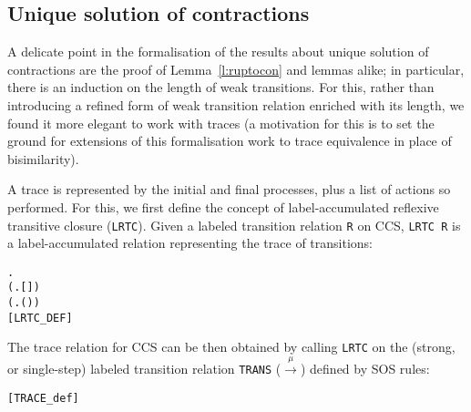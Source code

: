 \subsection{Unique solution of contractions}

A delicate point in the formalisation of the results about unique solution of
contractions are the proof of Lemma~\ref{l:ruptocon} and lemmas alike;
in particular, there is
 an induction on the length of weak transitions. 
For this, rather than 
 introducing a refined form of weak transition relation
enriched with its length, 
we found it more elegant  to  work with traces
(a motivation for this is to set the ground for extensions of this
formalisation work to trace equivalence in place of bisimilarity).



A trace is represented by the initial and final processes, plus
a list of actions  so performed.
For this, we first 
 define the concept of label-accumulated reflexive transitive closure
 (\texttt{LRTC}).
Given a labeled transition relation \texttt{R} on CCS, \texttt{LRTC R} is
a label-accumulated relation representing the trace of transitions:
\begin{alltt}
     \HOLSymConst{\HOLTokenDefEquality{}}
  \HOLSymConst{\HOLTokenForall{}}.
      (\HOLSymConst{\HOLTokenForall{}}.   [] ) \HOLSymConst{\HOLTokenConj{}}
      (\HOLSymConst{\HOLTokenForall{}}    .     \HOLSymConst{\HOLTokenConj{}}     \HOLSymConst{\HOLTokenImp{}}   (\HOLSymConst{::}) ) \HOLSymConst{\HOLTokenImp{}}
         \hfill{[LRTC_DEF]}
\end{alltt}
The trace relation for CCS can be then obtained
 by calling \texttt{LRTC} on the (strong, or single-step) labeled transition
 relation \texttt{TRANS} ($\overset{\mu}{\rightarrow}$) defined by SOS rules:
\begin{alltt}
 \HOLSymConst{\HOLTokenDefEquality{}}  \hfill{[TRACE_def]}
\end{alltt}

